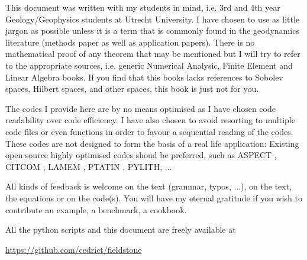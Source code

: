 
This document was written with my students in mind, i.e. 3rd and 4th year 
Geology/Geophysics students at Utrecht University. 
I have chosen to use as little jargon as possible unless it is a term that is 
commonly found in the geodynamics literature (methods paper as well as 
application papers). There is no mathematical proof of any theorem that may 
be mentioned but I will try to refer to the appropriate sources, i.e.
generic Numerical Analysic, Finite Element and 
Linear Algebra books. If you find that this books lacks references
to Sobolev spaces, Hilbert spaces, and other spaces, this book is just not for you.  

The codes I provide here are by no means optimised as I have chosen code readability 
over code efficiency. I have also chosen to avoid resorting to multiple code 
files or even functions in order to favour a sequential reading of the codes. 
These codes are not designed to form the basis of a real life application:
Existing open source highly optimised codes shoud be preferred, such as 
ASPECT \cite{krhb12,hedg17}, CITCOM \cite{zhzm00,zhmt08}, LAMEM \cite{kapb16}, 
PTATIN \cite{mabl14,mabl15}, PYLITH\cite{aakw13}, ... 

All kinds of feedback is welcome on the text (grammar, typos, ...), on the text, the equations
or on the code(s). You will have my eternal gratitude if you wish to contribute an 
example, a benchmark, a cookbook. 

All the python scripts and this document are freely available at 
\begin{center}
\url{https://github.com/cedrict/fieldstone}
\end{center}

